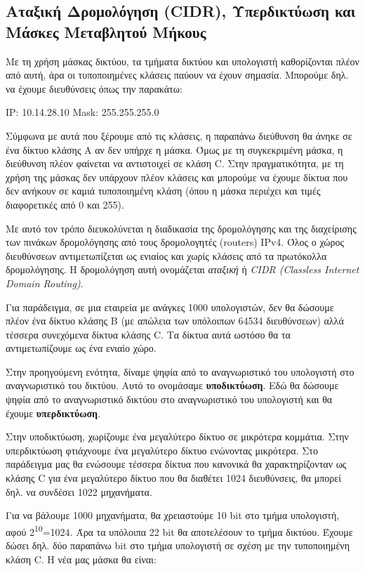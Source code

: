 %
%
\subsection{Αταξική Δρομολόγηση (CIDR), Υπερδικτύωση και Μάσκες Μεταβλητού Μήκους}

Με τη χρήση μάσκας δικτύου, τα τμήματα δικτύου και υπολογιστή καθορίζονται πλέον από αυτή, άρα οι τυποποιημένες κλάσεις παύουν να έχουν σημασία. Μπορούμε δηλ. να έχουμε διευθύνσεις όπως την παρακάτω:

IP: 10.14.28.10
Mask: 255.255.255.0

Σύμφωνα με αυτά που ξέρουμε από τις κλάσεις, η παραπάνω διεύθυνση θα άνηκε σε ένα δίκτυο κλάσης Α αν δεν υπήρχε η μάσκα. Όμως με τη συγκεκριμένη μάσκα, η διεύθυνση πλέον φαίνεται να αντιστοιχεί σε κλάση C. Στην πραγματικότητα, με τη χρήση της μάσκας δεν υπάρχουν πλέον κλάσεις και μπορούμε να έχουμε δίκτυα που δεν ανήκουν σε καμιά τυποποιημένη κλάση (όπου η μάσκα περιέχει και τιμές διαφορετικές από 0 και 255).

Με αυτό τον τρόπο διευκολύνεται η διαδικασία της δρομολόγησης και της διαχείρισης των πινάκων δρομολόγησης από τους δρομολογητές (routers) IPv4.  Όλος ο χώρος διευθύνσεων αντιμετωπίζεται ως ενιαίος και χωρίς κλάσεις από τα πρωτόκολλα δρομολόγησης.  Η δρομολόγηση αυτή ονομάζεται \emph{αταξική} ή \emph{CIDR (Classless Internet Domain Routing)}.

Για παράδειγμα, σε μια εταιρεία με ανάγκες 1000 υπολογιστών, δεν θα δώσουμε πλέον ένα δίκτυο κλάσης B (με απώλεια των υπόλοιπων 64534 διευθύνσεων) αλλά τέσσερα συνεχόμενα δίκτυα κλάσης C. Τα δίκτυα αυτά ωστόσο θα τα αντιμετωπίζουμε ως ένα ενιαίο χώρο.

\begin{inthebox}
Στην προηγούμενη ενότητα, δίναμε ψηφία από το αναγνωριστικό του υπολογιστή στο αναγνωριστικό του δικτύου. Αυτό το ονομάσαμε \textbf{υποδικτύωση}. Εδώ θα δώσουμε ψηφία από το αναγνωριστικό δικτύου στο αναγνωριστικό του υπολογιστή και θα έχουμε \textbf{υπερδικτύωση}.

Στην υποδικτύωση,  χωρίζουμε ένα μεγαλύτερο δίκτυο σε μικρότερα κομμάτια. Στην υπερδικτύωση φτιάχνουμε ένα μεγαλύτερο δίκτυο ενώνοντας μικρότερα. Στο παράδειγμα μας θα ενώσουμε τέσσερα δίκτυα που κανονικά θα χαρακτηρίζονταν ως κλάσης C για ένα μεγαλύτερο δίκτυο που θα διαθέτει 1024 διευθύνσεις, θα μπορεί δηλ. να συνδέσει 1022 μηχανήματα.\\
\end{inthebox}

Για να βάλουμε 1000 μηχανήματα, θα χρειαστούμε 10 bit στο τμήμα υπολογιστή, αφού 2\textsuperscript{10}=1024. Άρα τα υπόλοιπα 22 bit θα αποτελέσουν το τμήμα δικτύου. Έχουμε δώσει δηλ. δύο παραπάνω bit στο τμήμα υπολογιστή σε σχέση με την τυποποιημένη κλάση C. Η νέα μας μάσκα θα είναι:

